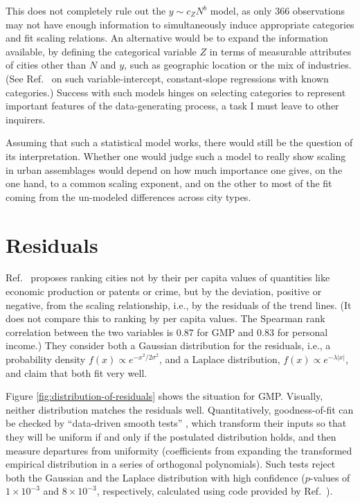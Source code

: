 \documentclass{pnastwo}
\begin{document}
\begin{article}
This does not completely rule out the $y \sim c_Z N^b$ model, as only 366
observations may not have enough information to simultaneously induce
appropriate categories and fit scaling relations.  An alternative would be to
expand the information available, by defining the categorical variable $Z$ in
terms of measurable attributes of cities other than $N$ and $y$, such as
geographic location or the mix of industries.  (See Ref.\
\cite{Gelman-Hill-data-analysis} on such variable-intercept, constant-slope
regressions with known categories.)  Success with such models hinges on
selecting categories to represent important features of the data-generating
process, a task I must leave to other inquirers.

Assuming that such a statistical model works, there would still be the question
of its interpretation.  Whether one would judge such a model to really show
scaling in urban assemblages would depend on how much importance one gives, on
the one hand, to a common scaling exponent, and on the other to most of the fit
coming from the un-modeled differences across city types. 

\section{Residuals}
\label{sec:residuals}

Ref.\ \cite{Bettencourt-et-al-urban-scaling-and-its-deviations} proposes
ranking cities not by their per capita values of quantities like economic
production or patents or crime, but by the deviation, positive or negative,
from the scaling relationship, i.e., by the residuals of the trend lines.  (It
does not compare this to ranking by per capita values.  The Spearman rank
correlation between the two variables is $0.87$ for GMP and $0.83$ for personal
income.)  They consider both a Gaussian distribution for the residuals, i.e., a
probability density $f(x) \propto e^{-x^2/2\sigma^2}$, and a Laplace
distribution, $f(x) \propto e^{-\lambda|x|}$, and claim that both fit very
well.

Figure \ref{fig:distribution-of-residuals} shows the situation for GMP.
Visually, neither distribution matches the residuals well.  Quantitatively,
goodness-of-fit can be checked by ``data-driven smooth tests''
\cite{WCMKallenberg-Ledwina-data-driven-smooth-tests}, which transform their
inputs so that they will be uniform if and only if the postulated distribution
holds, and then measure departures from uniformity (coefficients from expanding
the transformed empirical distribution in a series of orthogonal polynomials).
Such tests reject both the Gaussian and the Laplace distribution with high
confidence ($p$-values of $1\times{10}^{-3}$ and $8\times{10}^{-3}$,
respectively, calculated using code provided by Ref.\ \cite{ddst}).


\end{article}
\end{document}
